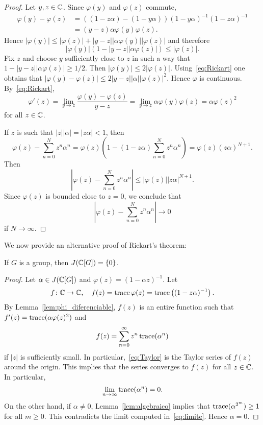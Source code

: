 \begin{proof}	
	Let $y,z\in\mathbb{C}$. Since $\varphi(y)$ and $\varphi(z)$ commute, 
	\begin{equation}
		\label{eq:Rickart}
		\begin{aligned}
			\varphi(y)-\varphi(z)&=\left( (1-z\alpha)-(1-y\alpha)\right)(1-y\alpha)^{-1}(1-z\alpha)^{-1}\\
			&=(y-z)\alpha\varphi(y)\varphi(z).
		\end{aligned}
	\end{equation}
	Hence $|\varphi(y)|\leq|\varphi(z)|+|y-z||\alpha\varphi(y)||\varphi(z)|$ and therefore 
	\[
		|\varphi(y)|\left( 1-|y-z||\alpha\varphi(z)|\right)\leq|\varphi(z)|.
	\]
	Fix $z$ and choose $y$ sufficiently close to $z$ in such a way that $1-|y-z||\alpha\varphi(z)|\geq1/2$. Then
	$|\varphi(y)|\leq2|\varphi(z)|$. Using~\eqref{eq:Rickart} one obtains that 
	$|\varphi(y)-\varphi(z)|\leq2|y-z||\alpha||\varphi(z)|^2$. 
	Hence $\varphi$ is continuous. By~\eqref{eq:Rickart}, 
	\[
	\varphi'(z)
	=\lim_{y\to z}\frac{\varphi(y)-\varphi(z)}{y-z}
	=\lim_{y\to z}\alpha\varphi(y)\varphi(z)
	=\alpha\varphi(z)^2
	\]
	for all $z\in\mathbb{C}$.

	If $z$ is such that $|z||\alpha|=|z\alpha|<1$, then  
	\[
		\varphi(z)-\sum_{n=0}^Nz^n\alpha^n
		=\varphi(z)\left(1-(1-z\alpha)\sum_{n=0}^Nz^n\alpha^n\right)
		=\varphi(z)(z\alpha)^{N+1}.
	\]
	Then 
	\[
		\left|\varphi(z)-\sum_{n=0}^Nz^n\alpha^n\right|\leq|\varphi(z)||z\alpha|^{N+1}.
	\]
	Since $\varphi(z)$ is bounded close to $z=0$, we conclude that 
	\[
 \left|\varphi(z)-\sum_{n=0}^Nz^n\alpha^n\right|\to0
 \]
 if $N\to\infty$.
\end{proof}

We now provide an alternative proof of Rickart's theorem: 

\begin{theorem}[Rickart]
	If $G$ is a group, then $J(\mathbb{C}[G])=\{0\}$.
\end{theorem}

\begin{proof}
	Let $\alpha\in J(\mathbb{C}[G])$ and $\varphi(z)=(1-\alpha z)^{-1}$. Let 
	\[
    f\colon\mathbb{C}\to \mathbb{C},\quad  
	f(z)=\operatorname{trace}\varphi(z)=\operatorname{trace}\left((1-z\alpha)^{-1}\right).
    \]
    By Lemma~\ref{lem:phi_diferenciable},
	$f(z)$ is an entire function such that  $f'(z)=\operatorname{trace}(\alpha\varphi(z)^2)$ and 
	\begin{equation}
		\label{eq:Taylor}
		f(z)=\sum_{n=0}^\infty z^n\operatorname{trace}(\alpha^n)
	\end{equation}
	if $|z|$ is sufficiently small. In particular,~\eqref{eq:Taylor} is the Taylor series of $f(z)$ around the origin. This implies that the series converges to $f(z)$ for all $z\in\mathbb{C}$. In particular,
	\begin{equation}
		\label{eq:limite}
		\lim_{n\to\infty}\operatorname{trace}(\alpha^n)=0.
	\end{equation}
	On the other hand, if $\alpha\ne0$, Lemma~\ref{lem:algebraico} implies that 
	$\operatorname{trace}(\alpha^{2^m})\geq1$ for all $m\geq0$. This contradicts the limit computed in~\eqref{eq:limite}. Hence $\alpha=0$.
\end{proof}

